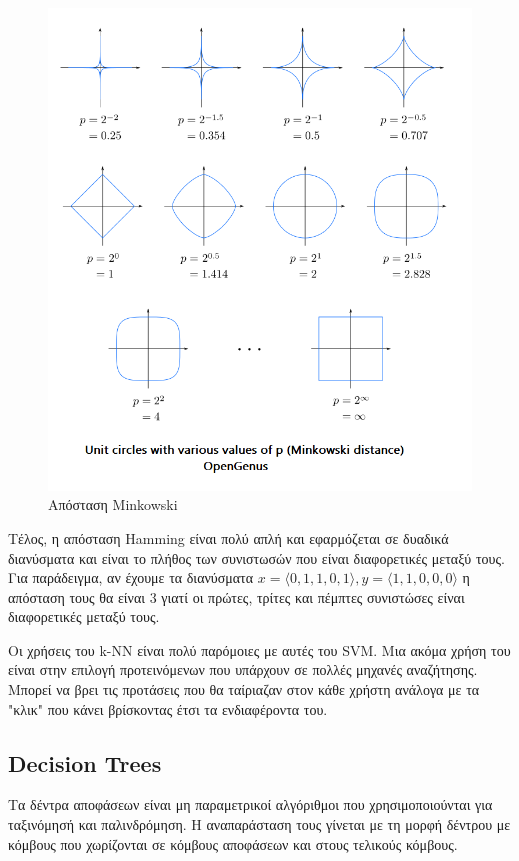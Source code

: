\begin{figure}[H]
    \centering
    \includegraphics[width=1\textwidth]{images/minkowskiDistance.png}
    \caption{Απόσταση \textlatin{Minkowski}}
\end{figure}

Τέλος, η απόσταση \textlatin{Hamming} είναι πολύ απλή και εφαρμόζεται σε δυαδικά διανύσματα και
είναι το πλήθος των συνιστωσών που είναι διαφορετικές μεταξύ τους. Για παράδειγμα, αν έχουμε τα
διανύσματα $x=\langle 0,1,1,0,1\rangle,y=\langle 1,1,0,0,0\rangle$ η απόσταση τους θα είναι $3$
γιατί οι πρώτες, τρίτες και πέμπτες συνιστώσες είναι διαφορετικές μεταξύ τους.

Οι χρήσεις του \textlatin{k-NN} είναι πολύ παρόμοιες με αυτές του \textlatin{SVM}. Μια ακόμα χρήση
του είναι στην επιλογή προτεινόμενων που υπάρχουν σε πολλές μηχανές αναζήτησης. Μπορεί να βρει
τις προτάσεις που θα ταίριαζαν στον κάθε χρήστη ανάλογα με τα "κλικ" που κάνει βρίσκοντας έτσι τα
ενδιαφέροντα του.
\subsection{\textlatin{Decision Trees}}
Τα δέντρα αποφάσεων είναι μη παραμετρικοί αλγόριθμοι που χρησιμοποιούνται για ταξινόμησή και
παλινδρόμηση. Η αναπαράσταση τους γίνεται με τη μορφή δέντρου με κόμβους που χωρίζονται σε
κόμβους αποφάσεων και στους τελικούς κόμβους.

